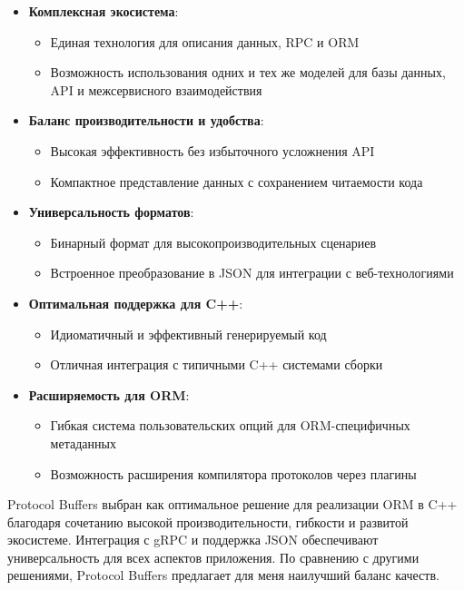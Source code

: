         \begin{itemize}
            \item \textbf{Комплексная экосистема}:
            \begin{itemize}
                \item Единая технология для описания данных, RPC и ORM
                \item Возможность использования одних и тех же моделей для базы данных, API и межсервисного взаимодействия
            \end{itemize}

            \item \textbf{Баланс производительности и удобства}:
            \begin{itemize}
                \item Высокая эффективность без избыточного усложнения API
                \item Компактное представление данных с сохранением читаемости кода
            \end{itemize}

            \item \textbf{Универсальность форматов}:
            \begin{itemize}
                \item Бинарный формат для высокопроизводительных сценариев
                \item Встроенное преобразование в JSON для интеграции с веб-технологиями
            \end{itemize}

            \item \textbf{Оптимальная поддержка для C++}:
            \begin{itemize}
                \item Идиоматичный и эффективный генерируемый код
                \item Отличная интеграция с типичными C++ системами сборки
            \end{itemize}

            \item \textbf{Расширяемость для ORM}:
            \begin{itemize}
                \item Гибкая система пользовательских опций для ORM-специфичных метаданных
                \item Возможность расширения компилятора протоколов через плагины
            \end{itemize}
        \end{itemize}


        Protocol Buffers выбран как оптимальное решение для реализации ORM в C++ благодаря сочетанию высокой производительности, гибкости и развитой экосистеме. Интеграция с gRPC и поддержка JSON обеспечивают универсальность для всех аспектов приложения. По сравнению с другими решениями, Protocol Buffers предлагает для меня наилучший баланс качеств.
